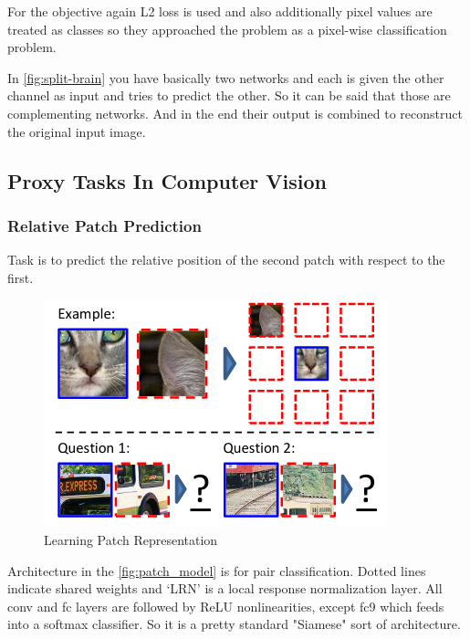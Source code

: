 \documentclass{article}
\begin{document}
For the objective again L2 loss is  used and also additionally pixel values
are treated as classes so they approached the problem as a pixel-wise
classification problem.
 
In \ref{fig:split-brain} you have basically two networks and each is given
the other channel as input and tries to predict the other.
So it can be said that those are complementing networks.
And in the end their output is combined to reconstruct the original input image.
 
\subsection{Proxy Tasks In Computer Vision}
 
\subsubsection{Relative Patch Prediction}
Task is to predict the relative position of the second patch
with respect to the first.
\begin{figure}[H]
   \centering
   \includegraphics[width=0.8\linewidth]{figures/proxy-task-context-prediction.png}
   \caption{Learning Patch Representation}
   \label{fig:learning_patch_representation}
   \end{figure}
 
 
   Architecture in the \ref{fig:patch_model} is for pair classification.
   Dotted lines indicate shared weights and
   ‘LRN’ is a local response normalization layer.
   All conv and fc layers are followed by ReLU nonlinearities,
   except fc9 which feeds into a softmax classifier.
   So it is a pretty standard "Siamese" sort of architecture.
 
\end{document}
